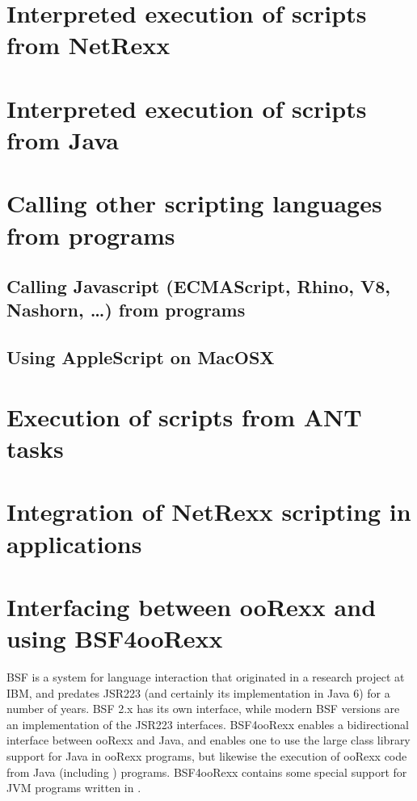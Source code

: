 \section{Interpreted execution of \nr{} scripts from NetRexx}
 
\section{Interpreted execution of \nr{} scripts from Java}
 
\section{Calling other scripting languages from \nr{} programs}
 
\subsection{Calling Javascript (ECMAScript, Rhino, V8, Nashorn, …) from \nr{} programs}
 
\subsection{Using AppleScript on MacOSX}
 
\section{Execution of \nr{} scripts from ANT tasks}
 
\section{Integration of NetRexx scripting in applications}
 
\section{Interfacing between ooRexx and \nr{} using BSF4ooRexx}
BSF is a system for language interaction that originated in a research project at IBM, and predates JSR223 (and certainly its implementation in Java 6) for a number of years. BSF 2.x has its own interface, while modern BSF versions are an implementation of the JSR223 interfaces. BSF4ooRexx enables a bidirectional interface between ooRexx and Java, and enables one to use the large class library support for Java in ooRexx programs, but likewise the execution of ooRexx code from Java (including \nr{}) programs. BSF4ooRexx contains some special support for JVM programs written in \nr{}.
